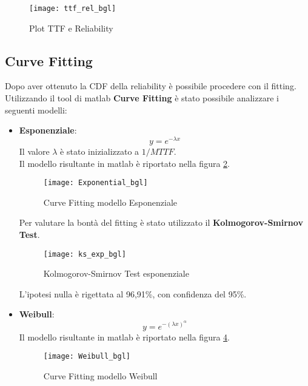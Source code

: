 \begin{figure}[!htbp]
  \centering
  \texttt{[image: ttf\_rel\_bgl]}
  \caption{Plot TTF e Reliability}
  \label{ffda_ttf_rel_bgl}
\end{figure}


\subsection{Curve Fitting}

Dopo aver ottenuto la CDF della reliability è possibile procedere con il fitting.\\
Utilizzando il tool di matlab \textbf{Curve Fitting} è stato possibile
analizzare i seguenti modelli:

\clearpage

\begin{itemize}
  \item \textbf{Esponenziale}:
  $$ y = e^{- \lambda  x} $$
  Il valore $\lambda$ è stato inizializzato a $1/MTTF$.\\
  Il modello risultante in matlab è riportato nella figura \ref{ffda_Exponential_bgl}.\\

  \begin{figure}[!htbp]
    \texttt{[image: Exponential\_bgl]}
    \caption{Curve Fitting modello Esponenziale}
    \label{ffda_Exponential_bgl}
  \end{figure}

  Per valutare la bontà del fitting è stato utilizzato il \textbf{Kolmogorov-Smirnov Test}.\\

  \begin{figure}[!htbp]
    \centering
    \texttt{[image: ks\_exp\_bgl]}
    \caption{Kolmogorov-Smirnov Test esponenziale}
    \label{ffda_ks_exp_bgl}
  \end{figure}

  L'ipotesi nulla è rigettata al 96,91\%, con confidenza del 95\%.

  \clearpage

  \item \textbf{Weibull}:
  $$ y = e^{- (\lambda x)^\alpha} $$
  Il modello risultante in matlab è riportato nella figura \ref{ffda_Weibull_bgl}.\\
  \begin{figure}[!htbp]
    \centering
    \texttt{[image: Weibull\_bgl]}
    \caption{Curve Fitting modello Weibull}
    \label{ffda_Weibull_bgl}
  \end{figure}


\end{itemize}
